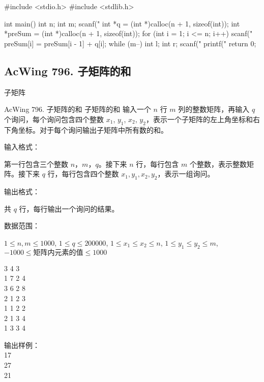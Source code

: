 \begin{mycpponecol}[前缀和]
#include <stdio.h>
#include <stdlib.h>

int main()
{
    int n;
    int m;
    scanf("%
    int *q = (int *)calloc(n + 1, sizeof(int));
    int *preSum = (int *)calloc(n + 1, sizeof(int));
    for (int i = 1; i <= n; i++) {
        scanf("%
        preSum[i] = preSum[i - 1] + q[i];
    }
    while (m--) {
        int l;
        int r;
        scanf("%
        printf("%
    }
    return 0;
}
\end{mycpponecol}

\subsection{AcWing 796. 子矩阵的和}
子矩阵
\begin{problembox}{AcWing 796. 子矩阵的和}
    \small{子矩阵的和}
    输入一个 $n$ 行 $m$ 列的整数矩阵，再输入 $q$ 个询问，每个询问包含四个整数 $x_1$, $y_1$, $x_2$, $y_2$，表示一个子矩阵的左上角坐标和右下角坐标。对于每个询问输出子矩阵中所有数的和。

    输入格式：

    第一行包含三个整数 $n$，$m$，$q$。接下来 $n$ 行，每行包含 $m$ 个整数，表示整数矩阵。接下来 $q$ 行，每行包含四个整数 $x_1, y_1, x_2, y_2$，表示一组询问。
    
    输出格式：

    共 $q$ 行，每行输出一个询问的结果。
    
    数据范围：

    $1 \le n,m \le 1000$, 
    $1 \le q \le 200000$, 
    $1 \le x_1 \le x_2 \le n$, 
    $1 \le y_1 \le y_2 \le m$, 
    $-1000 \le 矩阵内元素的值 \le 1000$

    \begin{inputblock}
        3 4 3 \\
        1 7 2 4 \\
        3 6 2 8 \\
        2 1 2 3 \\
        1 1 2 2 \\
        2 1 3 4\\
        1 3 3 4
        \end{inputblock}%
        \begin{minipage}[t]{.5\textwidth}
        输出样例：\\
        17 \\
        27 \\
        21
    \end{minipage}
\end{problembox}

